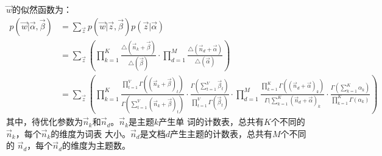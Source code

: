 $\vec{w}$的似然函数为：
\begin{displaymath}
\begin{split}
p(\vec{w}|\vec{\alpha}, \vec{\beta}) 
&= \sum_{\vec{z}}{
  p(\vec{w}|\vec{z},\vec{\beta})p(\vec{z}|\vec{\alpha})}\\
&= \sum_{\vec{z}}{(
    \prod_{k=1}^{K}{
        \frac{\triangle(\vec{n}_k+\vec{\beta})}{\triangle(\vec{\beta})}
    }
    \cdot
    \prod_{d=1}^{M}{
        \frac{\triangle(\vec{n}_d+\vec{\alpha})}{\triangle(\vec{\alpha})}
    }
)}\\
&= \sum_{\vec{z}}{(
\prod_{k=1}^{K}{
     {
     \frac{\prod_{t=1}^{V}{\Gamma{((\vec{n}_k+\vec{\beta})_t)}}}{\Gamma{(\sum_{t=1}^{V}{(\vec{n}_k+\vec{\beta})_t})}}
     }
      \cdot
     {
      \frac{\Gamma{(\sum_{t=1}^{V}{\vec{\beta}_t})}}{\prod_{t=1}^{V}{\Gamma{(\vec{\beta}_t)}}}
     }
}
\cdot
\prod_{d=1}^{M}{
     {
      \frac{\prod_{k=1}^{K}{\Gamma((\vec{n}_d+\vec{\alpha})_k)}}{\Gamma(\sum_{k=1}^{K}{(\vec{n}_d+\vec{\alpha})_k}}
     }
\cdot
     { 
      \frac{\Gamma(\sum_{k=1}^{K}{\alpha_k})}{\prod_{k=1}^{K}{\Gamma(\alpha_k)}}
     }
}
)}
\end{split}
\end{displaymath} 
其中，待优化参数为$\vec{n}_k$和$\vec{n}_d$。$\vec{n}_k$是主题$k$产生单
词的计数表，总共有$K$个不同的$\vec{n}_k$，每个$\vec{n}_k$的维度为词表
大小。$\vec{n}_d$是文档$d$产生主题的计数表，总共有$M$个不同的
$\vec{n}_d$，每个$\vec{n}_d$的维度为主题数。


